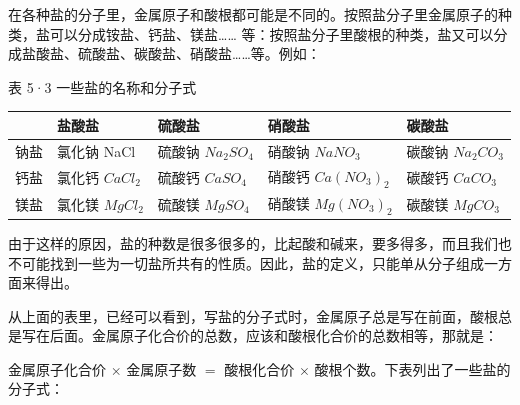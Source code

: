 在各种盐的分子里，金属原子和酸根都可能是不同的。按照盐分子里金属原子的种类，盐可以分成铵盐、钙盐、镁盐\ldots\ldots{}
等：按照盐分子里酸根的种类，盐又可以分成盐酸盐、硫酸盐、碳酸盐、硝酸盐\ldots\ldots 等。例如：

表 5·3 一些盐的名称和分子式

{\def\LTcaptype{none} %
\begin{longtable}[]{@{}
  >{\raggedright\arraybackslash}p{}
  >{\raggedright\arraybackslash}p{}
  >{\raggedright\arraybackslash}p{}
  >{\raggedright\arraybackslash}p{}
  >{\raggedright\arraybackslash}p{}@{}}
\toprule\noalign{}
\begin{minipage}[b]{\linewidth}\raggedright
\end{minipage} & \begin{minipage}[b]{\linewidth}\raggedright
盐酸盐
\end{minipage} & \begin{minipage}[b]{\linewidth}\raggedright
硫酸盐
\end{minipage} & \begin{minipage}[b]{\linewidth}\raggedright
硝酸盐
\end{minipage} & \begin{minipage}[b]{\linewidth}\raggedright
碳酸盐
\end{minipage} \\
\midrule\noalign{}
\endhead
\bottomrule\noalign{}
\endlastfoot
钠盐 & 氯化钠 NaCl & 硫酸钠 \(Na_2SO_4\) & 硝酸钠 \(NaNO_3\) & 碳酸钠
\(Na_2CO_3\) \\
钙盐 & 氯化钙 \(CaCl_2\) & 硫酸钙 \(CaSO_4\) & 硝酸钙 \(Ca(NO_3)_2\) &
碳酸钙 \(CaCO_3\) \\
镁盐 & 氯化镁 \(MgCl_2\) & 硫酸镁 \(MgSO_4\) & 硝酸镁 \(Mg(NO_3)_2\) &
碳酸镁 \(MgCO_3\) \\
\end{longtable}
}

由于这样的原因，盐的种数是很多很多的，比起酸和碱来，要多得多，而且我们也不可能找到一些为一切盐所共有的性质。因此，盐的定义，只能单从分子组成一方面来得出。

从上面的表里，已经可以看到，写盐的分子式时，金属原子总是写在前面，酸根总是写在后面。金属原子化合价的总数，应该和酸根化合价的总数相等，那就是：

金属原子化合价 \(\times\) 金属原子数 \(=\) 酸根化合价 \(\times\)
酸根个数。下表列出了一些盐的分子式：

